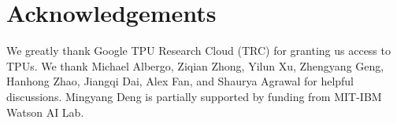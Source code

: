 \documentclass{article}
\theoremstyle{plain}
\theoremstyle{definition}
\theoremstyle{remark}
\begin{document}








\section*{Acknowledgements}
We greatly thank Google TPU Research Cloud (TRC) for granting us access to TPUs. We thank Michael Albergo, Ziqian Zhong, Yilun Xu, Zhengyang Geng, Hanhong Zhao, Jiangqi Dai, Alex Fan, and Shaurya Agrawal for helpful discussions. Mingyang Deng is partially supported by funding from MIT-IBM Watson AI Lab.





\end{document}
